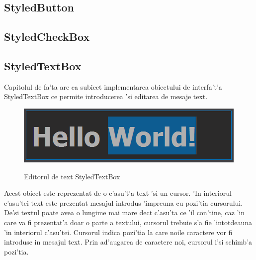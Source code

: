
\subsection{StyledButton}


\subsection{StyledCheckBox}


\subsection{StyledTextBox}

Capitolul de fa'ta are ca subiect implementarea obiectului de interfa't'a StyledTextBox ce permite introducerea 'si editarea de mesaje text. 

\begin{center}
\begin{figure}[h]
    \centering
    \includegraphics{img/ch5_styledtextbox.png}
    \label{fig:fig_5_1}
    \caption{Editorul de text StyledTextBox}
\end{figure}
\end{center}

\medskip

Acest obiect este reprezentat de o c'asu't'a text 'si un cursor. 'In interiorul c'asu'tei text este prezentat mesajul introdus 'impreuna cu pozi'tia cursorului. De'si textul poate avea o lungime mai mare dec{\ia}t c'asu'ta ce 'il con'tine, caz 'in care va fi prezentat'a doar o parte a textului, cursorul trebuie s'a fie 'intotdeauna 'in interiorul c'asu'tei. Cursorul indica pozi'tia la care noile caractere vor fi introduse in mesajul text. Prin ad'augarea de caractere noi, cursorul i'si schimb'a pozi'tia.

